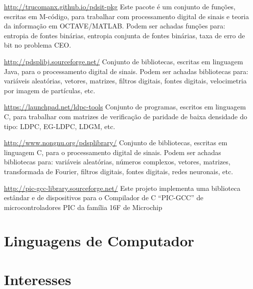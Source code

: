 \documentclass[11pt,a4paper,sans]{moderncv} %
\begin{document}
			{\url{http://trucomanx.github.io/pdsit-pkg}}
			{}{}
			{Este pacote é um conjunto de funções, escritas em M-código, para trabalhar 
			com processamento digital de sinais e teoria da 
			informação em OCTAVE/MATLAB. Podem ser achadas 
			funções para: entropia de fontes binárias, 
			entropia conjunta de fontes binárias, 
			taxa de erro de bit no problema CEO. }
			
			{\url{http://pdsplibj.sourceforge.net/}}
			{}{}
			{Conjunto de bibliotecas, escritas em linguagem Java, para 
			o processamento digital de sinais. Podem ser achadas 
			bibliotecas para: variáveis aleatórias, 
			vetores, matrizes, filtros 
			digitais, fontes digitais, velocimetria por imagem de partículas, etc.}

			{\url{https://launchpad.net/ldpc-tools}}
			{}{}
			{Conjunto de programas, escritos em linguagem C, para 
			trabalhar com matrizes de verificação de paridade 
			de baixa densidade do tipo: LDPC, EG-LDPC, LDGM, etc.}
			

			{\url{http://www.nongnu.org/pdsplibrary/}}
			{}{}
			{Conjunto de bibliotecas, escritas em linguagem C, para 
			o processamento digital de sinais. Podem ser achadas 
			bibliotecas para: variáveis aleatórias, números complexos, 
			vetores, matrizes, transformada de Fourier, filtros 
			digitais, fontes digitais, redes neuronais, etc.}

			{\url{http://pic-gcc-library.sourceforge.net/}}
			{}{}
			{Este projeto implementa  uma biblioteca estândar e de 
			dispositivos para o Compilador de C ``PIC-GCC'' de 
			microcontroladores PIC da família 16F de Microchip}

\section{Linguagens de Computador}




\section{Interesses}

\renewcommand{\listitemsymbol}{-~} %
\end{document}
